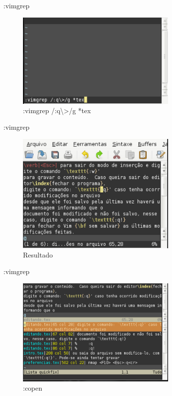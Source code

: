 \begin{frame}{:vimgrep}
	\begin{figure}[h!]
	  \caption{:vimgrep /:q\textbackslash{}>/g *tex}
	  \centering
	    \includegraphics[width=0.7\textwidth]{sections/vimgrep/vimgrep1}
	\end{figure}
\end{frame}
\begin{frame}{:vimgrep}
	\begin{figure}[h!]
	  \caption{Resultado}
	  \centering
	    \includegraphics[width=0.7\textwidth]{sections/vimgrep/vimgrep2}
	\end{figure}
\end{frame}
\begin{frame}{:vimgrep}
	\begin{figure}[h!]
	  \caption{:copen}
	  \centering
	    \includegraphics[width=0.7\textwidth]{sections/vimgrep/vimgrep3}
	\end{figure}
\end{frame}
